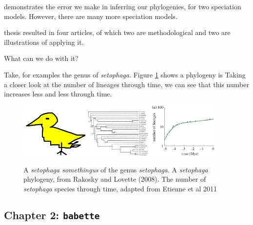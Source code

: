demonstrates the error we make in 
inferring our phylogenies, for two speciation models.
However, there are many more speciation models.

thesis resulted in four articles,
of which two are methodological and two are illustrations
of applying it. 

What can we do with it?


Take, for examples the genus of \textit{setophaga}.
Figure \ref{fig:setophaga} shows a phylogeny is 
Taking a closer look at the number of lineages through time,
we can see that this number increases less and less through time.

\begin{figure}[H]


  \includegraphics[width=0.3\textwidth]{setophaga.png}
  \includegraphics[width=0.3\textwidth]{rabosky_lovette_2008_setophaga_phylogeny.png}
  \includegraphics[width=0.3\textwidth]{etienne_et_al_2011_fig_3_a.png}
  \caption{
    A \textit{setophaga somethingus} of the genus \textit{setophaga}.
    A \textit{setophaga} phylogeny, from Rakosky and Lovette (2008).
    The number of \textit{setophaga} species through time, adapted from Etienne et al 2011
  }
  \label{fig:setophaga}
\end{figure}




\subsection{Chapter 2: \texttt{babette}}

